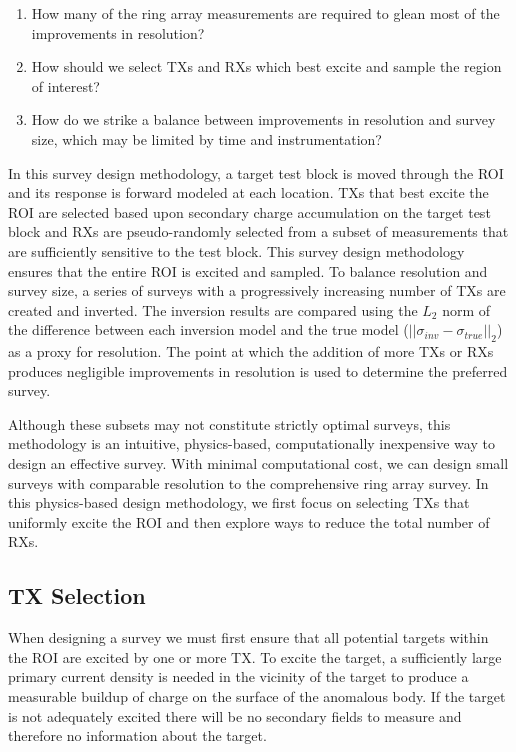 \documentclass[preprint,authoryear,12pt]{elsarticle}
\begin{document}
\begin{enumerate}
   \item How many of the ring array measurements are required to glean most of the improvements in resolution?
   \item How should we select TXs and RXs which best excite and sample the region of interest?
   \item How do we strike a balance between improvements in resolution and survey size, which may be limited by time and instrumentation?
\end{enumerate}

In this survey design methodology, a target test block is moved through the ROI and its response is forward modeled at each location. TXs that best excite the ROI are selected based upon secondary charge accumulation on the target test block and RXs are pseudo-randomly selected from a subset of measurements that are sufficiently sensitive to the test block. This survey design methodology ensures that the entire ROI is excited and sampled. To balance resolution and survey size, a series of surveys with a progressively increasing number of TXs are created and inverted. The inversion results are compared using the $L_2$ norm of the difference between each inversion model and the true model ($\left|| \sigma_{inv} - \sigma_{true} \right||_2$) as a proxy for resolution. The point at which the addition of more TXs or RXs produces negligible improvements in resolution is used to determine the preferred survey.

Although these subsets may not constitute strictly optimal surveys, this methodology is an intuitive, physics-based, computationally inexpensive way to design an effective survey. With minimal computational cost, we can design small surveys with comparable resolution to the comprehensive ring array survey. In this physics-based design methodology, we first focus on selecting TXs that uniformly excite the ROI and then explore ways to reduce the total number of RXs.

\subsection{TX Selection}
\label{sec:RingArray_SurveyDesign_TXSelection}

When designing a survey we must first ensure that all potential targets within the ROI are excited by one or more TX. To excite the target, a sufficiently large primary current density is needed in the vicinity of the target to produce a measurable buildup of charge on the surface of the anomalous body. If the target is not adequately excited there will be no secondary fields to measure and therefore no information about the target.
\end{document}
